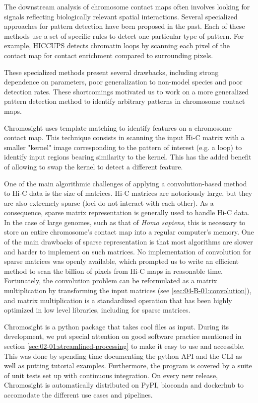 The downstream analysis of chromosome contact maps often involves looking for signals reflecting biologically relevant spatial interactions. Several specialized approaches for pattern detection have been proposed in the past. Each of these methods use a set of specific rules to detect one particular type of pattern. For example, HICCUPS \cite{rao3DMapHuman2014} detects chromatin loops by scanning each pixel of the contact map for contact enrichment compared to surrounding pixels.

These specialized methods present several drawbacks, including strong dependence on parameters, poor generalization to non-model species and poor detection rates. These shortcomings motivated us to work on a more generalized pattern detection method to identify arbitrary patterns in chromosome contact maps.

Chromosight uses template matching to identify features on a chromosome contact map. This technique consists in scanning the input Hi-C matrix with a smaller "kernel" image corresponding to the pattern of interest (e.g. a loop) to identify input regions bearing similarity to the kernel. This has the added benefit of allowing to swap the kernel to detect a different feature.

One of the main algorithmic challenges of applying a convolution-based method to Hi-C data is the size of matrices. Hi-C matrices are notoriously large, but they are also extremely sparse (loci do not interact with each other). As a consequence, sparse matrix representation is generally used to handle Hi-C data. In the case of large genomes, such as that of \textit{Homo sapiens}, this is necessary to store an entire chromosome's contact map into a regular computer's memory. One of the main drawbacks of sparse representation is that most algorithms are slower and harder to implement on such matrices. No implementation of convolution for sparse matrices was openly available, which prompted us to write an efficient method to scan the billion of pixels from Hi-C maps in reasonable time. Fortunately, the convolution problem can be reformulated as a matrix multiplication by transforming the input matrices (see \ref{sec:04-B-01:convolution}), and matrix multiplication is a standardized operation that has been highly optimized in low level libraries, including for sparse matrices.

Chromosight is a python package that takes cool files as input. During its development, we put special attention on good software practice mentioned in section \ref{sec:02-01:streamlined-processing} to make it easy to use and accessible. This was done by spending time documenting the python \acrshort{API} and the \acrshort{CLI} as well as putting tutorial examples. Furthermore, the program is covered by a suite of unit tests set up with continuous integration. On every new release, Chromosight is automatically distributed on PyPI, bioconda and dockerhub to accomodate the different use cases and pipelines.

